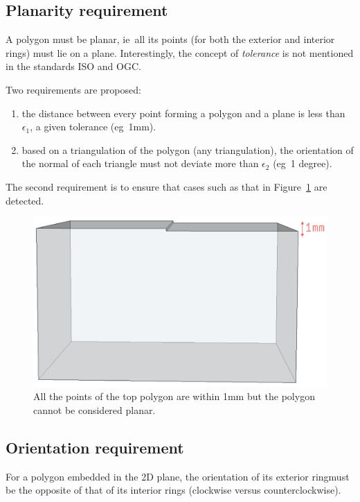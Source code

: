 \documentclass[a4paper,parskip=half,11pt]{scrartcl}
\newcommand{\ie}{ie}
\newcommand{\eg}{eg}
\begin{document}
\subsection{Planarity requirement}

A polygon must be planar, \ie\ all its points (for both the exterior and interior rings) must lie on a plane.
Interestingly, the concept of \emph{tolerance} is not mentioned in the standards ISO and OGC\@.

Two requirements are proposed:
\begin{enumerate}
  \item the distance between every point forming a polygon and a plane is less than $\epsilon_1$, a given tolerance (\eg\ 1mm).
  \item based on a triangulation of the polygon (any triangulation), the orientation of the normal of each triangle must not deviate more than $\epsilon_2$ (\eg\ 1 degree).
\end{enumerate}

The second requirement is to ensure that cases such as that in Figure~\ref{fig:planarity_fold} are detected.
\begin{figure}
  \centering
  \includegraphics[width=0.5\linewidth]{figs/planarity_fold}
  \caption{All the points of the top polygon are within 1mm but the polygon cannot be considered planar.}
\label{fig:planarity_fold}
\end{figure}

\subsection{Orientation requirement}

For a polygon embedded in the 2D plane, the orientation of its exterior ringmust be the opposite of that of its interior rings (clockwise versus counterclockwise).
\end{document}
